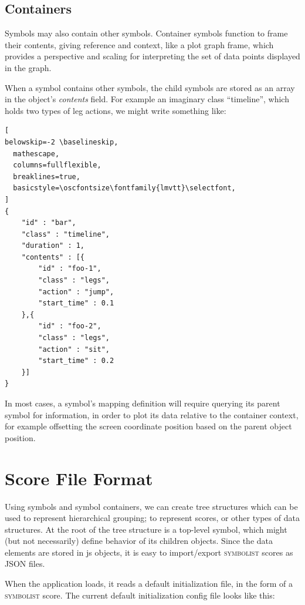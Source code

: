 \documentclass{article}
\def\symbolist{\textsc{symbolist}\xspace}
\def\oscfontsize{\tiny}
\begin{document}
\subsection{Containers}
Symbols may also contain other symbols. 
Container symbols function to frame their contents, giving reference and context, like a plot graph frame, which provides a perspective and scaling for interpreting the set of data points displayed in the graph.

When a symbol contains other symbols, the child symbols are stored as an array in the object's \textit{contents} field. For example an imaginary class ``timeline'', which holds two types of leg actions, we might write something like:

\begin{lstlisting}[
belowskip=-2 \baselineskip,
  mathescape,
  columns=fullflexible,
  breaklines=true,
  basicstyle=\oscfontsize\fontfamily{lmvtt}\selectfont,
]
{
    "id" : "bar",
    "class" : "timeline",
    "duration" : 1,
    "contents" : [{
        "id" : "foo-1",
        "class" : "legs",
        "action" : "jump",
        "start_time" : 0.1
    },{
        "id" : "foo-2",
        "class" : "legs",
        "action" : "sit",
        "start_time" : 0.2
    }]
}

\end{lstlisting}

In most cases, a symbol's mapping definition will require querying its parent symbol for information, in order to plot its data relative to the container context, for example offsetting the screen coordinate position based on the parent object position.

\section{Score File Format}\label{sec:score}

Using symbols and symbol containers, we can create tree structures which can be used to represent hierarchical grouping; to represent scores, or other types of data structures.
At the root of the tree structure is a top-level symbol, which might (but not necessarily) define behavior of its children objects.
Since the data elements are stored in js objects, it is easy to import/export \symbolist scores as JSON files.

When the application loads, it reads a default initialization file, in the form of a \symbolist score.
The current default initialization config file looks like this:
\end{document}
